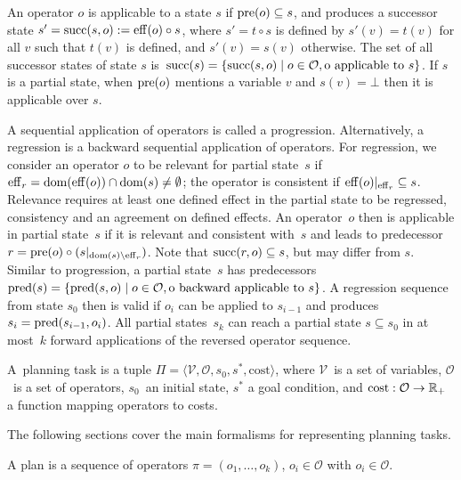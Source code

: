 An operator $o$ is applicable to a state $s$ if $\operatorname{pre}(o) \subseteq s$, and produces a successor state $s'=\operatorname{succ}(s,o):=\operatorname{eff}(o)\circ s$, where $s'=t\circ s$ is defined by $s'(v)=t(v)$ for all $v$ such that $t(v)$ is defined, and $s'(v)=s(v)$ otherwise. The set of all successor states of state $s$ is~$\operatorname{succ}(s)=\{\operatorname{succ}(s,o)\mid o\in \mathcal{O}, \text{o applicable to }s\}$. If $s$ is a partial state, when $\operatorname{pre}(o)$ mentions a variable $v$ and $s(v) = \bot$ then it is applicable over $s$.

A sequential application of operators is called a progression. Alternatively, a regression is a backward sequential application of operators. For regression, we consider an operator $o$ to be relevant for partial state~$s$ if $\operatorname{eff}_r=\operatorname{dom}(\operatorname{eff}(o))\cap\operatorname{dom}(s)\neq\emptyset$; the operator is consistent if $\operatorname{eff}(o)|_{\operatorname{eff}_r} \subseteq s$. Relevance requires at least one defined effect in the partial state to be regressed, consistency and an agreement on defined effects. An operator~$o$ then is  applicable in partial state~$s$ if it is relevant and consistent with~$s$ and leads to predecessor $r=\operatorname{pre}(o)\circ (s|_{\operatorname{dom}(s)\setminus\operatorname{eff}_r})$. Note that $\operatorname{succ}(r,o)\subseteq s$, but may differ from $s$. Similar to progression, a partial state~$s$ has predecessors $\operatorname{pred}(s)=\{\operatorname{pred}(s,o)\mid o\in \mathcal{O}, \text{o backward applicable to }s\}$. A regression sequence from state $s_0$ then is valid if $o_i$ can be applied to $s_{i-1}$ and produces $s_i=\operatorname{pred}(s_{i-1},o_i)$. All partial states~$s_k$ can reach a partial state $s\subseteq s_0$ in at most~$k$ forward applications of the reversed operator sequence.

\begin{definition}\label{def:planningtask}
    A~\sas planning task is a tuple $\Pi=\langle\mathcal{V},\mathcal{O},s_0,s^*, \text{cost}\rangle$, where $\mathcal{V}$~is a set of variables, $\mathcal{O}$~is a set of operators, $s_0$~an initial state, $s^*$ a goal condition, and $\text{cost}:\mathcal{O}\rightarrow\mathbb{R}_{+}$ a function mapping operators to costs.
\end{definition}

The following sections cover the main formalisms for representing planning tasks.

\begin{definition}[Plan]\label{def:plan}
    A plan is a sequence of operators $\pi=(o_1,\ldots,o_k)$, $o_i\in \mathcal{O}$ with $o_i \in \mathcal{O}$.
\end{definition}

